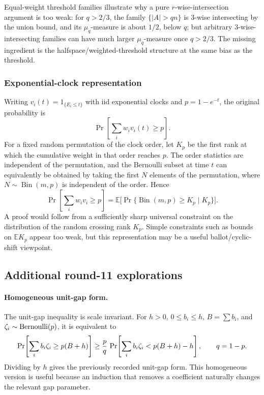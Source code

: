 \documentclass[12pt]{article}
\begin{document}
Equal-weight threshold families illustrate why a pure \(r\)-wise-intersection
argument is too weak: for \(q>2/3\), the family
\(\{|A|>qn\}\) is \(3\)-wise intersecting by the union bound, and its
\(\mu_q\)-measure is about \(1/2\), below \(q\); but arbitrary
\(3\)-wise-intersecting families can have much larger \(\mu_q\)-measure once
\(q>2/3\).  The missing ingredient is the halfspace/weighted-threshold
structure at the same bias as the threshold.

\subsubsection*{Exponential-clock representation}

Writing \(v_i(t)=1_{\{E_i\le t\}}\) with iid exponential clocks and
\(p=1-e^{-t}\), the original probability is
\[
   \Pr\left[\sum_i w_i v_i(t)\ge p\right].
\]
For a fixed random permutation of the clock order, let \(K_p\) be the first
rank at which the cumulative weight in that order reaches \(p\).  The order
statistics are independent of the permutation, and the Bernoulli subset at
time \(t\) can equivalently be obtained by taking the first \(N\) elements of
the permutation, where \(N\sim\operatorname{Bin}(m,p)\) is independent of the
order.  Hence
\[
   \Pr\left[\sum_i w_i v_i\ge p\right]
   =\mathbb E\big[\Pr\{\operatorname{Bin}(m,p)\ge K_p\mid K_p\}\big].
\]
A proof would follow from a sufficiently sharp universal constraint on the
distribution of the random crossing rank \(K_p\).  Simple constraints such as
bounds on \(\mathbb E K_p\) appear too weak, but this representation may be a
useful ballot/cyclic-shift viewpoint.



\subsection*{Additional round-11 explorations}

\paragraph{Homogeneous unit-gap form.}
The unit-gap inequality is scale invariant.  For \(h>0\), \(0\le b_i\le h\),
\(B=\sum b_i\), and \(\zeta_i\sim{\rm Bernoulli}(p)\), it is equivalent to
\[
 \Pr\!\left[\sum_i b_i\zeta_i\ge p(B+h)\right]
 \ge {p\over q}\,
 \Pr\!\left[\sum_i b_i\zeta_i<p(B+h)-h\right],
 \qquad q=1-p.
\]
Dividing by \(h\) gives the previously recorded unit-gap form.  This
homogeneous version is useful because an induction that removes a coefficient
naturally changes the relevant gap parameter.
\end{document}
